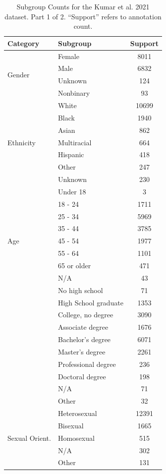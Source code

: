 \documentclass[11pt]{article}
\theoremstyle{definition}
\theoremstyle{plain}
\begin{document}
\begin{table}[t]
	\centering
	\small
	\begin{tabular}{llc}
		\toprule
		\textbf{Category} & \textbf{Subgroup} & \textbf{Support}\\
		\midrule
		\multirow{4}{*}{Gender} & Female & 8011 \\
		& Male & 6832 \\
		& Unknown & 124 \\
		& Nonbinary & 93 \\
		\midrule
		\multirow{7}{*}{Ethnicity} & White & 10699 \\
		& Black & 1940 \\
		& Asian & 862 \\
		& Multiracial & 664 \\
		& Hispanic & 418 \\
		& Other & 247 \\
		& Unknown & 230 \\
		\midrule
		\multirow{9}{*}{Age} & Under 18 & 3 \\
		& 18 - 24 & 1711 \\
		& 25 - 34 & 5969 \\
		& 35 - 44 & 3785 \\
		& 45 - 54 & 1977 \\
		& 55 - 64 & 1101 \\
		& 65 or older & 471 \\
		& N/A & 43 \\
		\midrule
		\multirow{10}{*}{Education} & No high school & 71 \\
		& High School graduate & 1353 \\
		& College, no degree & 3090 \\
		& Associate degree & 1676 \\
		& Bachelor's degree & 6071 \\
		& Master's degree & 2261 \\
		& Professional degree & 236 \\
		& Doctoral degree & 198 \\
		& N/A & 71 \\
		& Other & 32 \\
		\midrule
		\multirow{5}{*}{Sexual Orient.} & Heterosexual & 12391 \\
		& Bisexual & 1665 \\
		& Homosexual & 515 \\
		& N/A & 302 \\
		& Other & 131 \\
		\bottomrule
	\end{tabular}
	\caption{Subgroup Counts for the Kumar et al. 2021 dataset. Part 1 of 2. ``Support'' refers to annotation count.}
	\label{tab:kumar-stats1}
\end{table}
\end{document}
